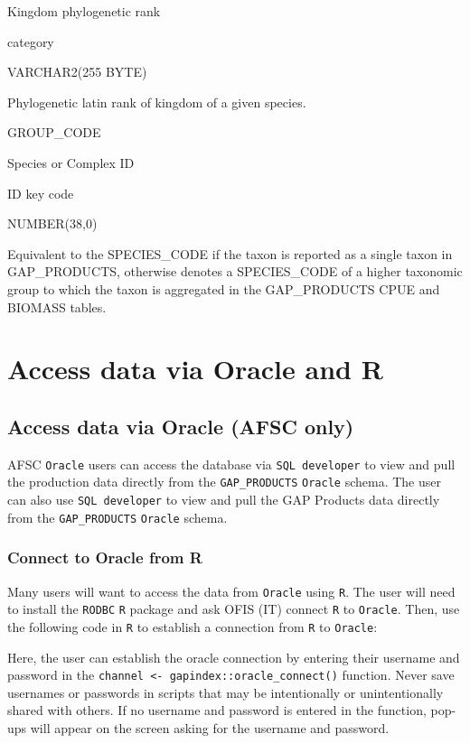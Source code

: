 \documentclass[
  letterpaper,
  oneside,
  open=any]{scrbook}
\begin{document}
Kingdom phylogenetic rank

category

VARCHAR2(255 BYTE)

Phylogenetic latin rank of kingdom of a given species.

GROUP\_CODE

Species or Complex ID

ID key code

NUMBER(38,0)

Equivalent to the SPECIES\_CODE if the taxon is reported as a single
taxon in GAP\_PRODUCTS, otherwise denotes a SPECIES\_CODE of a higher
taxonomic group to which the taxon is aggregated in the GAP\_PRODUCTS
CPUE and BIOMASS tables.

\chapter{Access data via Oracle and
R}\label{access-data-via-oracle-and-r}

\section*{Access data via Oracle (AFSC
only)}\label{access-data-via-oracle-afsc-only}


AFSC \texttt{Oracle} users can access the database via
\texttt{SQL\ developer} to view and pull the production data directly
from the \texttt{GAP\_PRODUCTS} \texttt{Oracle} schema. The user can
also use \texttt{SQL\ developer} to view and pull the GAP Products data
directly from the \texttt{GAP\_PRODUCTS} \texttt{Oracle} schema.

\subsection{Connect to Oracle from R}\label{connect-to-oracle-from-r}

Many users will want to access the data from \texttt{Oracle} using
\texttt{R}. The user will need to install the \texttt{RODBC} \texttt{R}
package and ask OFIS (IT) connect \texttt{R} to \texttt{Oracle}. Then,
use the following code in \texttt{R} to establish a connection from
\texttt{R} to \texttt{Oracle}:

Here, the user can establish the oracle connection by entering their
username and password in the
\texttt{channel\ \textless{}-\ gapindex::oracle\_connect()} function.
Never save usernames or passwords in scripts that may be intentionally
or unintentionally shared with others. If no username and password is
entered in the function, pop-ups will appear on the screen asking for
the username and password.
\end{document}

